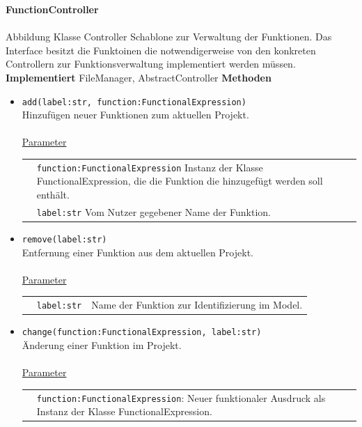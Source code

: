 \documentclass{article}
\begin{document}
\begin{itemize}
\newpage
\textbf{\large{FunctionController}}
\\\\Abbildung Klasse
\newline\newline
Controller Schablone zur Verwaltung der Funktionen. Das Interface besitzt die Funktoinen die notwendigerweise von den konkreten Controllern zur Funktionsverwaltung implementiert werden müssen.
\newline\newline
\textbf{\large{Implementiert}} FileManager, AbstractController
\newline\newline
\textbf{\large{Methoden}}
\begin{itemize}
\item \texttt{add(label:str, function:FunctionalExpression)}\\ Hinzufügen neuer Funktionen zum aktuellen Projekt.\\\\
\underline{{Parameter}}\\
\begin{tabular}{lp{10.7cm}}
 & \texttt{function:FunctionalExpression}  Instanz der Klasse FunctionalExpression, die die Funktion die hinzugefügt werden soll enthält. \\
  & \texttt{label:str} Vom Nutzer gegebener Name der Funktion. \\
\end{tabular}
\item \texttt{remove(label:str)}\\ Entfernung einer Funktion aus dem aktuellen Projekt. \\\\
\underline{{Parameter}}\\
\begin{tabular}{lll}
 & \texttt{label:str} & Name der Funktion zur Identifizierung im Model. \\
\end{tabular}
\item \texttt{change(function:FunctionalExpression, label:str)}\\ Änderung einer Funktion im Projekt.\\\\
\underline{{Parameter}}\\
\begin{tabular}{lp{10.7cm}}
 & \texttt{function:FunctionalExpression}:  Neuer funktionaler Ausdruck als Instanz der Klasse FunctionalExpression.\\

\end{tabular}
\end{itemize}
\end{itemize}
\end{document}
